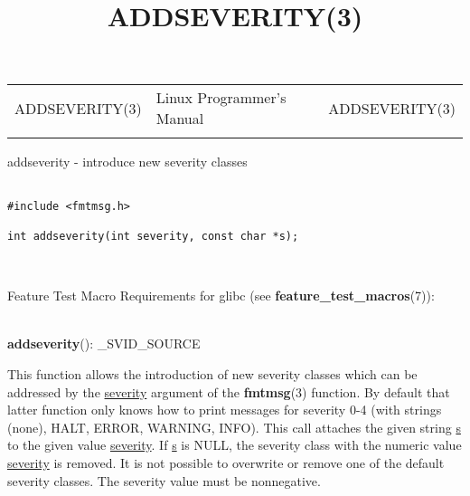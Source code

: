 \documentclass[]{article}
\title{ADDSEVERITY(3)}
\author{}
\date{}
\let\realtextbf=\textbf
\renewcommand{\textbf}[1]{\textcolor{boldcolor}{\realtextbf{#1}}}
\renewcommand{\emph}[1]{\underline{#1}}
\begin{document}
\maketitle

\begin{longtable}[c]{@{}lll@{}}
\toprule\addlinespace
ADDSEVERITY(3) & Linux Programmer's Manual & ADDSEVERITY(3)
\\\addlinespace
\bottomrule
\end{longtable}


addseverity - introduce new severity classes


\begin{verbatim}
 
#include <fmtmsg.h>
 
int addseverity(int severity, const char *s);
\end{verbatim}

~

Feature Test Macro Requirements for glibc (see
\textbf{feature\_test\_macros}(7)): \\

~

\textbf{addseverity}(): \_SVID\_SOURCE


This function allows the introduction of new severity classes which can
be addressed by the \emph{severity} argument of the \textbf{fmtmsg}(3)
function. By default that latter function only knows how to print
messages for severity 0-4 (with strings (none), HALT, ERROR, WARNING,
INFO). This call attaches the given string \emph{s} to the given value
\emph{severity}. If \emph{s} is NULL, the severity class with the
numeric value \emph{severity} is removed. It is not possible to
overwrite or remove one of the default severity classes. The severity
value must be nonnegative.
\end{document}
